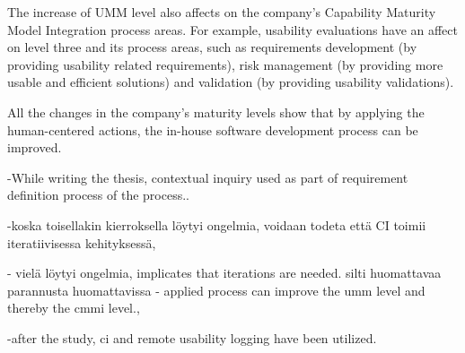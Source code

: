 \documentclass[12pt,a4paper,oneside,pdftex]{report}
\begin{document}
The increase of UMM level also affects on the company's Capability Maturity Model Integration process areas. For example, usability evaluations have an affect on level three and its process areas, such as requirements development (by providing usability related requirements), risk management (by providing more usable and efficient solutions) and validation (by providing usability validations).    

All the changes in the company's maturity levels show that by applying the human-centered actions, the in-house software development process can be improved.

    
  -While writing the thesis, contextual inquiry used as part of requirement definition process of the process..

  -koska toisellakin kierroksella löytyi ongelmia, voidaan todeta että CI toimii iteratiivisessa kehityksessä,




- vielä löytyi ongelmia, implicates that iterations are needed. silti huomattavaa parannusta huomattavissa
- applied process can improve the umm level and thereby the cmmi level.,

-after the study, ci and remote usability logging have been utilized. 





\end{document}
